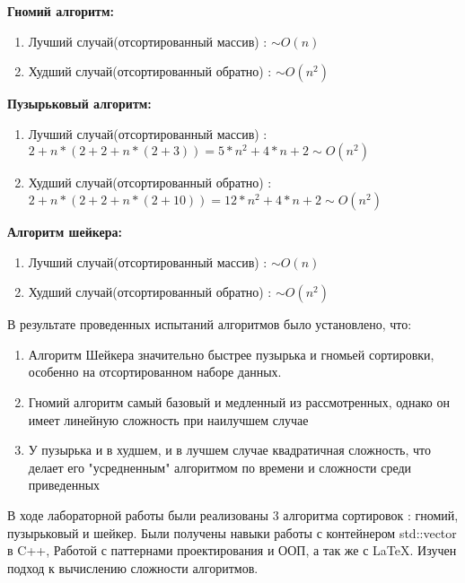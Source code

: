 \newpage
{}
\flushleft

\textbf{Гномий алгоритм:}
\begin{enumerate}
	\item Лучший случай(отсортированный массив) : $ \sim O(n)$
	\item Худший случай(отсортированный обратно) : $\sim O(n^2)$
\end{enumerate}	

\textbf{Пузырьковый алгоритм:}
\begin{enumerate}
	\item Лучший случай(отсортированный массив) : $2+n*(2+2+n*(2+3)) = 5*n^2 + 4*n + 2 \sim O(n^2)$
	\item Худший случай(отсортированный обратно) : $2+n*(2+2+n*(2+10)) = 12*n^2 + 4*n + 2 \sim O(n^2)$
\end{enumerate}	

\textbf{Алгоритм шейкера:}
\begin{enumerate}
	\item Лучший случай(отсортированный массив) : $\sim O(n)$
	\item Худший случай(отсортированный обратно) : $\sim O(n^2)$
\end{enumerate}		




\newpage
{}


В результате проведенных испытаний алгоритмов было установлено, что:
\begin{enumerate}
	\item Алгоритм Шейкера значительно быстрее пузырька и гномьей сортировки, особенно на отсортированном наборе данных.
	\item Гномий алгоритм самый базовый и медленный из рассмотренных, однако он имеет линейную сложность при наилучшем случае
	\item У пузырька и в худшем, и в лучшем случае квадратичная сложность, что делает его "усредненным" алгоритмом по времени и сложности среди приведенных
\end{enumerate}


\newpage
{}


\flushleft
В ходе лабораторной работы были реализованы 3 алгоритма сортировок : гномий, пузырьковый и шейкер. Были получены навыки работы с контейнером std::vector в C++, Работой с паттернами проектирования и ООП, а так же с \LaTeX. Изучен подход к вычислению сложности алгоритмов.